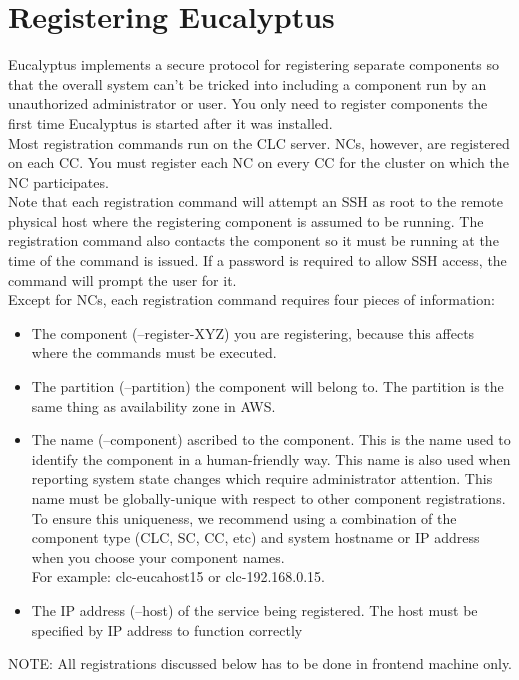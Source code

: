 \section{Registering Eucalyptus}
Eucalyptus implements a secure protocol for registering separate components so that the overall system can’t be tricked into including a component run by an unauthorized administrator or user. You only need to register components the first time Eucalyptus is started after it was installed.\\
Most registration commands run on the CLC server. NCs, however, are registered on each CC. You must register each NC on every CC for the cluster on which the NC participates.\\
Note that each registration command will attempt an SSH as root to the remote physical host where the registering component is assumed to be running. The registration command also contacts the component so it must be running at the time of the command is issued. If a password is required to allow SSH access, the command will prompt the user for it.\\
Except for NCs, each registration command requires four pieces of information:
\begin{itemize}
\item The component (--register-XYZ) you are registering, because this affects where the commands must be executed.
\item The partition (--partition) the component will belong to. The partition is the same thing as availability zone in AWS.
\item The name (--component) ascribed to the component. This is the name used to identify the component in a human-friendly way. This name is also used when reporting system state changes which require administrator attention. This name must be globally-unique with respect to other component registrations.\\
To ensure this uniqueness, we recommend using a combination of the component type (CLC, SC, CC, etc) and system hostname or IP address when you choose your component names. \\
For example: clc-eucahost15 or clc-192.168.0.15.
\item The IP address (--host) of the service being registered. The host must be specified by IP address to function correctly
\end{itemize}
NOTE: All registrations discussed below has to be done in frontend machine only.\\ \linebreak

